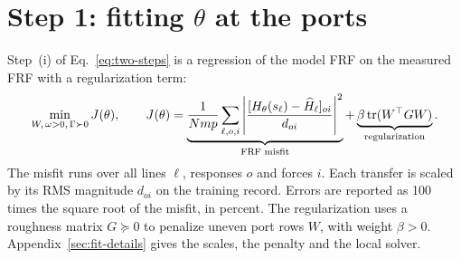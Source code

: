 \section{Step 1: fitting \texorpdfstring{$\theta$}{theta} at the ports}\label{sec:identification}
Step~(i) of Eq.~\eqref{eq:two-steps} is a regression of the model FRF on the
measured FRF with a regularization term:
\begin{equation}
 \min_{W,\,\omega>0,\,\Gamma\succ0}J(\theta),\qquad
 J(\theta)=\underbrace{\frac1{Nmp}\sum_{\ell,o,i}
 \left|\frac{[H_\theta(s_\ell)-\widehat H_\ell]_{oi}}{d_{oi}}\right|^2}_{\text{FRF misfit}}
 +\underbrace{\beta\operatorname{tr}(W^{\top}GW)}_{\text{regularization}}.
 \label{eq:objective}
\end{equation}
The misfit runs over all lines $\ell$, responses $o$ and forces $i$. Each
transfer is scaled by its RMS magnitude $d_{oi}$ on the training record.
Errors are reported as 100 times the square root of the misfit, in percent.
The regularization uses a roughness matrix $G\succeq0$ to penalize uneven
port rows $W$, with weight $\beta>0$. Appendix~\ref{sec:fit-details} gives
the scales, the penalty and the local solver.
